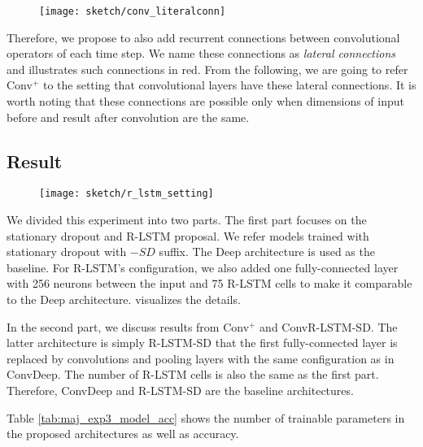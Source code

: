  \begin{figure}
\centering
\texttt{[image: sketch/conv\_literalconn]}
\label{fig:conv_literalconn}
\end{figure}

	Therefore, we propose to also add recurrent connections between convolutional operators of each time step. We name these connections as \textit{lateral connections} and \addfigure{\ref{fig:conv_literalconn}} illustrates such connections in red. From the following, we are going to refer Conv$^+$ to the setting that convolutional layers have these  lateral connections.  It is worth noting that these connections are possible only when dimensions of input before and result after convolution are the same.

\subsection{Result}

\begin{figure}
\centering
\texttt{[image: sketch/r\_lstm\_setting]}
\label{fig:rlstm_setting}
\end{figure}


We divided this experiment into two parts. The first part focuses on the stationary dropout and R-LSTM proposal. We refer models trained with stationary dropout with $-SD$ suffix. The Deep architecture is used as the baseline.  For R-LSTM's configuration, we also added one fully-connected layer with 256 neurons between the input and 75 R-LSTM cells to make it comparable to the Deep architecture. \addfigure{\ref{fig:rlstm_setting}} visualizes the details.


In the second part, we discuss results from  Conv$^+$ and ConvR-LSTM-SD. The latter architecture is simply R-LSTM-SD that the first fully-connected layer is replaced by convolutions and pooling layers with the same configuration as in ConvDeep. The number of R-LSTM cells is also the same as the first part. Therefore, ConvDeep and R-LSTM-SD are the baseline architectures.


Table \ref{tab:maj_exp3_model_acc} shows the number of trainable parameters in the proposed architectures as well as accuracy.

